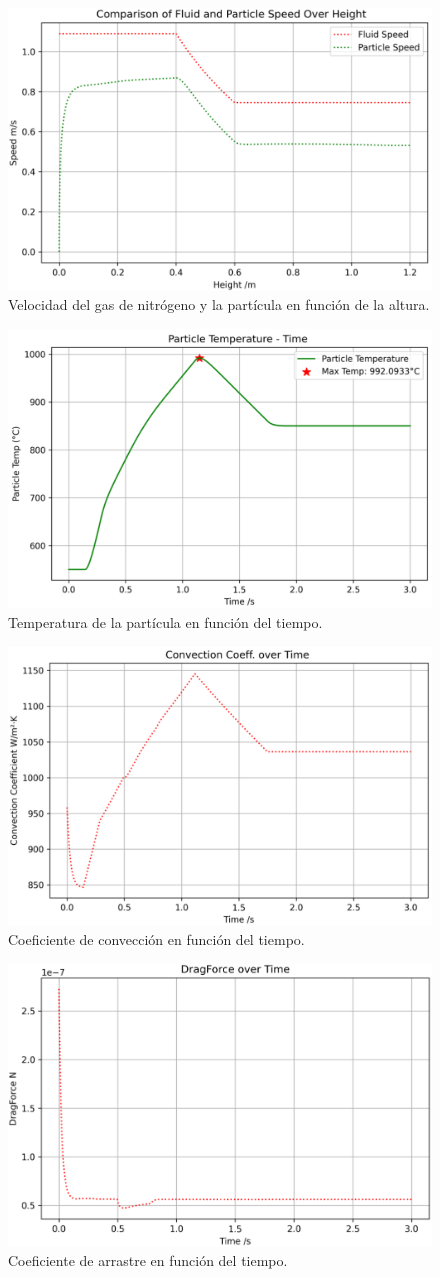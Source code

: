 \documentclass[11pt,stdletter,orderfromtodate,sigleft,twoside]{report}
\begin{document}
\begin{figure}[H]
    \centering
    \includegraphics[width=0.5\linewidth]{figures/Rad3.png}
    \caption{Velocidad del gas de nitrógeno y la partícula en función de la altura.}
    \label{fig:enter-label}
\end{figure}

\begin{figure}[H]
    \centering
    \includegraphics[width=0.5\linewidth]{figures/Rad4.png}
    \caption{Temperatura de la partícula en función del tiempo.}
    \label{fig:enter-label}
\end{figure}

\begin{figure}[H]
    \centering
    \includegraphics[width=0.5\linewidth]{figures/Rad5.png}
    \caption{Coeficiente de convección en función del tiempo.}
    \label{fig:enter-label}
\end{figure}

\begin{figure}[H]
    \centering
    \includegraphics[width=0.5\linewidth]{figures/Rad6.png}
    \caption{Coeficiente de arrastre en función del tiempo.}
    \label{fig:enter-label}
\end{figure}
\end{document}
